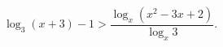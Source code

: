 \begin{ex}[type=inequality]
	\begin{condition}
		$ \log_3(x + 3) - 1>\dfrac{\log_x(x^2 - 3x + 2)}{\log_x 3} .$
	\end{condition}
\end{ex}